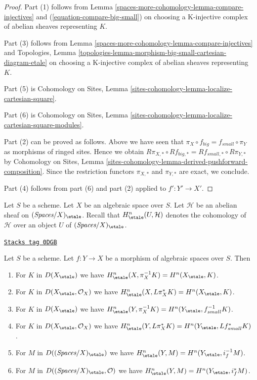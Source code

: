 \begin{proof}
Part (1) follows from
Lemma \ref{spaces-more-cohomology-lemma-compare-injectives}
and (\ref{equation-compare-big-small})
on choosing a K-injective complex of abelian sheaves representing $K$.

\medskip\noindent
Part (3) follows from Lemma \ref{spaces-more-cohomology-lemma-compare-injectives}
and Topologies, Lemma
\ref{topologies-lemma-morphism-big-small-cartesian-diagram-etale}
on choosing a K-injective complex of abelian sheaves representing $K$.

\medskip\noindent
Part (5) is Cohomology on Sites, Lemma
\ref{sites-cohomology-lemma-localize-cartesian-square}.

\medskip\noindent
Part (6) is  Cohomology on Sites, Lemma
\ref{sites-cohomology-lemma-localize-cartesian-square-modules}.

\medskip\noindent
Part (2) can be proved as follows. Above we have seen
that $\pi_X \circ f_{big} = f_{small} \circ \pi_Y$ as morphisms
of ringed sites. Hence we obtain
$R\pi_{X, *} \circ Rf_{big, *} = Rf_{small, *} \circ R\pi_{Y, *}$
by Cohomology on Sites, Lemma
\ref{sites-cohomology-lemma-derived-pushforward-composition}.
Since the restriction functors $\pi_{X, *}$ and $\pi_{Y, *}$
are exact, we conclude.

\medskip\noindent
Part (4) follows from part (6) and part (2) applied to $f' : Y' \to X'$.
\end{proof}

Let $S$ be a scheme. Let $X$ be an algebraic space over $S$.
Let $\mathcal{H}$ be an abelian sheaf on
$(\textit{Spaces}/X)_\etale$. Recall that $H^n_\etale(U, \mathcal{H})$
denotes the cohomology of $\mathcal{H}$ over an object
$U$ of $(\textit{Spaces}/X)_\etale$.

\begin{lemma}
\label{spaces-more-cohomology-lemma-compare-cohomology}
\href{https://stacks.math.columbia.edu/tag/0DGB}{\texttt{Stacks tag 0DGB}}

Let $S$ be a scheme.
Let $f : Y \to X$ be a morphism of algebraic spaces over $S$. Then
\begin{enumerate}
\item For $K$ in $D(X_\etale)$ we have
$H^n_\etale(X, \pi_X^{-1}K) = H^n(X_\etale, K)$.
\item For $K$ in $D(X_\etale, \mathcal{O}_X)$ we have
$H^n_\etale(X, L\pi_X^*K) = H^n(X_\etale, K)$.
\item For $K$ in $D(X_\etale)$ we have
$H^n_\etale(Y, \pi_X^{-1}K) = H^n(Y_\etale, f_{small}^{-1}K)$.
\item For $K$ in $D(X_\etale, \mathcal{O}_X)$ we have
$H^n_\etale(Y, L\pi_X^*K) = H^n(Y_\etale, Lf_{small}^*K)$.
\item For $M$ in $D((\textit{Spaces}/X)_\etale)$ we have
$H^n_\etale(Y, M) = H^n(Y_\etale, i_f^{-1}M)$.
\item For $M$ in $D((\textit{Spaces}/X)_\etale, \mathcal{O})$ we have
$H^n_\etale(Y, M) = H^n(Y_\etale, i_f^*M)$.
\end{enumerate}
\end{lemma}

